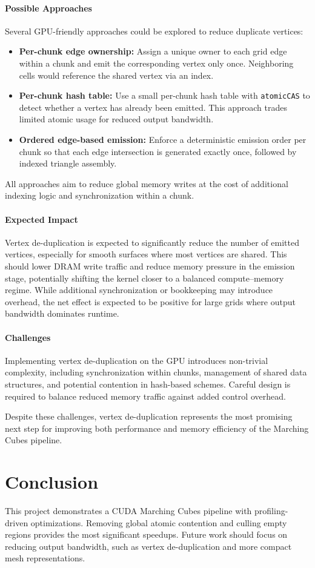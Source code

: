 \documentclass[11pt,a4paper]{article}
\begin{document}
\paragraph{Possible Approaches}
Several GPU-friendly approaches could be explored to reduce duplicate vertices:
\begin{itemize}
  \item \textbf{Per-chunk edge ownership:} Assign a unique owner to each grid edge within a chunk and emit the corresponding vertex only once. Neighboring cells would reference the shared vertex via an index.
  \item \textbf{Per-chunk hash table:} Use a small per-chunk hash table with
        \texttt{atomicCAS} to detect whether a vertex has already been emitted. This approach trades limited atomic usage for reduced output bandwidth.
  \item \textbf{Ordered edge-based emission:} Enforce a deterministic emission order per chunk so that each edge intersection is generated exactly once, followed by indexed triangle assembly.
\end{itemize}

All approaches aim to reduce global memory writes at the cost of additional indexing logic and synchronization within a chunk.

\paragraph{Expected Impact}
Vertex de-duplication is expected to significantly reduce the number of emitted vertices, especially for smooth surfaces where most vertices are shared. This should lower DRAM write traffic and reduce memory pressure in the emission stage, potentially shifting the kernel closer to a balanced compute--memory regime. While additional synchronization or bookkeeping may introduce overhead, the net effect is expected to be positive for large grids where output bandwidth dominates runtime.

\paragraph{Challenges}
Implementing vertex de-duplication on the GPU introduces non-trivial complexity, including synchronization within chunks, management of shared data structures, and potential contention in hash-based schemes. Careful design is required to balance reduced memory traffic against added control overhead.

Despite these challenges, vertex de-duplication represents the most promising next step for improving both performance and memory efficiency of the Marching Cubes pipeline.


\section{Conclusion}

This project demonstrates a CUDA Marching Cubes pipeline with profiling-driven optimizations. Removing global atomic contention and culling empty regions provides the most significant speedups. Future work should focus on reducing
output bandwidth, such as vertex de-duplication and more compact mesh representations.
\end{document}
